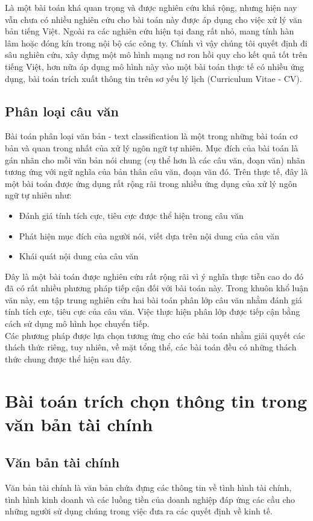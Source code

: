 \documentclass[14pt]{extreport}
\begin{document}
Là một bài toán khá quan trọng và được nghiên cứu khá rộng, nhưng hiện nay vẫn chưa có nhiều nghiên cứu cho bài toán này được áp dụng cho việc xử lý văn bản tiếng Việt. Ngoài ra các nghiên cứu hiện tại đang rất nhỏ, mang tính hàn lâm hoặc đóng kín trong nội bộ các công ty. Chính vì vậy chúng tôi quyết định đi sâu nghiên cứu, xây dựng một mô hình mạng nơ ron hồi quy cho kết quả tốt trên tiếng Việt, hơn nữa áp dụng mô hình này vào một bài toán thực tế có nhiều ứng dụng, bài toán trích xuất thông tin trên sơ yếu lý lịch (Curriculum Vitae - CV).

\subsection{Phân loại câu văn}
Bài toán phân loại văn bản - text classification là một trong những bài toán cơ bản và quan trong nhất của xử lý ngôn ngữ tự nhiên. Mục đích của bài toán là gán nhãn cho mỗi văn bản nói chung (cụ thể hơn là các câu văn, đoạn văn) nhãn tương ứng với ngữ nghĩa của bản thân câu văn, đoạn văn đó. Trên thực tế, đây là một bài toán được ứng dụng rất rộng rãi trong nhiều ứng dụng của xử lý ngôn ngữ tự nhiên như:
\begin{itemize}
    \item Đánh giá tính tích cực, tiêu cực được thể hiện trong câu văn
    \item Phát hiện mục đích của người nói, viết dựa trên nội dung của câu văn
    \item Khái quát nội dung của câu văn
\end{itemize}
Đây là một bài toán được nghiên cứu rất rộng rãi vì ý nghĩa thực tiễn cao do đó đã có rất nhiều phương pháp tiếp cận đối với bài toán này. Trong khuôn khổ luận văn này, em tập trung nghiên cứu hai bài toán phân lớp câu văn nhằm đánh giá tính tích cực, tiêu cực của câu văn. Việc thực hiện phân lớp được tiếp cận bằng cách sử dụng mô hình học chuyển tiếp.\\
Các phương pháp được lựa chọn tương ứng cho các bài toán nhằm giải quyết các thách thức riêng, tuy nhiên, về mặt tổng thể, các bài toán đều có những thách thức chung được thể hiện sau đây.

\section{Bài toán trích chọn thông tin trong văn bản tài chính}
\subsection{Văn bản tài chính}
Văn bản tài chính là văn bản chứa đựng  các thông tin về tình hình tài chính, tình hình kinh doanh và các luồng tiền của doanh nghiệp đáp ứng các cầu cho những người sử dụng chúng trong việc đưa ra các quyết định về kinh tế.
\end{document}
